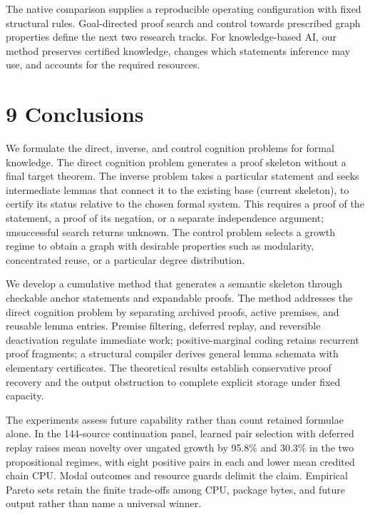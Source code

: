 \documentclass[pdflatex,sn-basic,Numbered]{sn-jnl}
\begin{document}
The native comparison supplies a reproducible operating configuration with fixed structural rules. Goal-directed proof search and control towards prescribed graph properties define the next two research tracks. For knowledge-based AI, our method preserves certified knowledge, changes which statements inference may use, and accounts for the required resources.

\section*{9 Conclusions}\label{conclusions}

We formulate the direct, inverse, and control cognition problems for formal knowledge. The direct cognition problem generates a proof skeleton without a final target theorem. The inverse problem takes a particular statement and seeks intermediate lemmas that connect it to the existing base (current skeleton), to certify its status relative to the chosen formal system. This requires a proof of the statement, a proof of its negation, or a separate independence argument; unsuccessful search returns unknown. The control problem selects a growth regime to obtain a graph with desirable properties such as modularity, concentrated reuse, or a particular degree distribution.

We develop a cumulative method that generates a semantic skeleton through checkable anchor statements and expandable proofs. The method addresses the direct cognition problem by separating archived proofs, active premises, and reusable lemma entries. Premise filtering, deferred replay, and reversible deactivation regulate immediate work; positive-marginal coding retains recurrent proof fragments; a structural compiler derives general lemma schemata with elementary certificates. The theoretical results establish conservative proof recovery and the output obstruction to complete explicit storage under fixed capacity.

The experiments assess future capability rather than count retained formulae alone. In the 144-source continuation panel, learned pair selection with deferred replay raises mean novelty over ungated growth by 95.8\% and 30.3\% in the two propositional regimes, with eight positive pairs in each and lower mean credited chain CPU. Modal outcomes and resource guards delimit the claim. Empirical Pareto sets retain the finite trade-offs among CPU, package bytes, and future output rather than name a universal winner.
\end{document}
